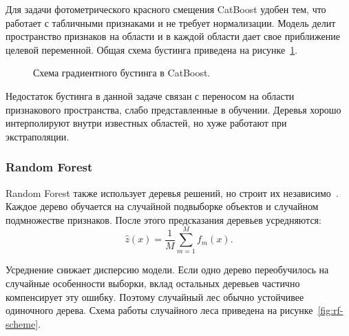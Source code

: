 \documentclass[12pt,a4paper]{article}
\begin{document}
Для задачи фотометрического красного смещения CatBoost удобен тем, что работает с табличными признаками и не требует нормализации. Модель делит пространство признаков на области и в каждой области дает свое приближение целевой переменной. Общая схема бустинга приведена на рисунке~\ref{fig:catboost-scheme}.

\begin{figure}[h]
\centering
{}
\caption{Схема градиентного бустинга в CatBoost.}
\label{fig:catboost-scheme}
\end{figure}

Недостаток бустинга в данной задаче связан с переносом на области признакового пространства, слабо представленные в обучении. Деревья хорошо интерполируют внутри известных областей, но хуже работают при экстраполяции.

\subsubsection{Random Forest}

Random Forest также использует деревья решений, но строит их независимо~\cite{breiman2001randomforest}. Каждое дерево обучается на случайной подвыборке объектов и случайном подмножестве признаков. После этого предсказания деревьев усредняются:
\begin{equation}
\hat{z}(x) = \frac{1}{M}\sum_{m=1}^{M} f_m(x).
\end{equation}

Усреднение снижает дисперсию модели. Если одно дерево переобучилось на случайные особенности выборки, вклад остальных деревьев частично компенсирует эту ошибку. Поэтому случайный лес обычно устойчивее одиночного дерева. Схема работы случайного леса приведена на рисунке~\ref{fig:rf-scheme}.
\end{document}
